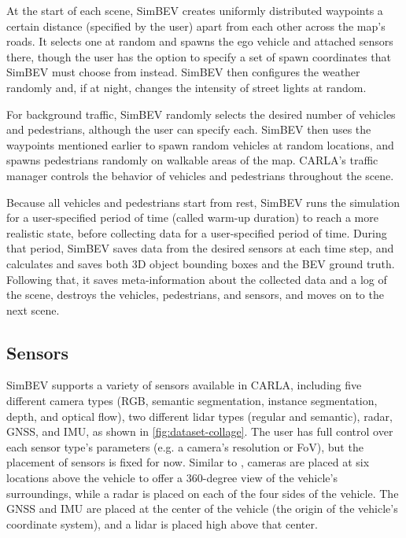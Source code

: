 At the start of each scene, SimBEV creates uniformly distributed waypoints a certain distance (specified by the user) apart from each other across the map's roads. It selects one at random and spawns the ego vehicle and attached sensors there, though the user has the option to specify a set of spawn coordinates that SimBEV must choose from instead. SimBEV then configures the weather randomly and, if at night, changes the intensity of street lights at random.

For background traffic, SimBEV randomly selects the desired number of vehicles and pedestrians, although the user can specify each. SimBEV then uses the waypoints mentioned earlier to spawn random vehicles at random locations, and spawns pedestrians randomly on walkable areas of the map. CARLA's traffic manager controls the behavior of vehicles and pedestrians throughout the scene.

Because all vehicles and pedestrians start from rest, SimBEV runs the simulation for a user-specified period of time (called warm-up duration) to reach a more realistic state, before collecting data for a user-specified period of time. During that period, SimBEV saves data from the desired sensors at each time step, and calculates and saves both 3D object bounding boxes and the BEV ground truth. Following that, it saves meta-information about the collected data and a log of the scene, destroys the vehicles, pedestrians, and sensors, and moves on to the next scene.

\subsection{Sensors} \label{subsec:simbev-sensors}

SimBEV supports a variety of sensors available in CARLA, including five different camera types (RGB, semantic segmentation, instance segmentation, depth, and optical flow), two different lidar types (regular and semantic), radar, GNSS, and IMU, as shown in \cref{fig:dataset-collage}. The user has full control over each sensor type's parameters (e.g. a camera's resolution or FoV), but the placement of sensors is fixed for now. Similar to \cite{caesar2020nuscenes}, cameras are placed at six locations above the vehicle to offer a 360-degree view of the vehicle's surroundings, while a radar is placed on each of the four sides of the vehicle. The GNSS and IMU are placed at the center of the vehicle (the origin of the vehicle's coordinate system), and a lidar is placed high above that center.


